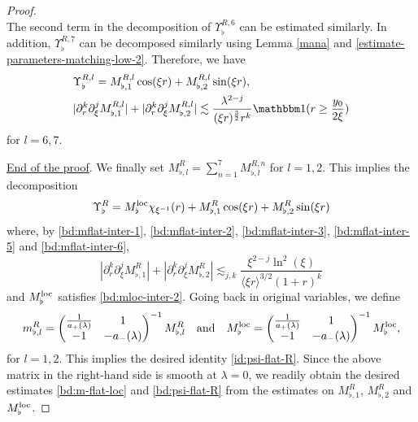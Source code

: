 \documentclass[11 pt]{amsart}
\theoremstyle{definition}
\theoremstyle{remark}
\numberwithin{equation}{section}
\begin{document}
\begin{proof}
$$$$
The second term in the decomposition of $\Upsilon^{R,6}_\flat$ can be estimated similarly. In addition, $\Upsilon_\flat^{R,7}$ can be decomposed similarly using Lemma \ref{mana} and \eqref{estimate-parameters-matching-low-2}. Therefore, we have
\begin{align}
\nonumber & \Upsilon^{R,l}_\flat=M^{R,l}_{\flat,1}\cos(\xi r)+M^{R,l}_{\flat,2}\sin(\xi r) ,\\
& \label{bd:mflat-inter-6} |\partial_r^k \partial_\xi^j M^{R,l}_{\flat,1}|+|\partial_r^k \partial_\xi^j M^{R,l}_{\flat,2}|\lesssim  \frac{\lambda^{2-j}}{(\xi r)^{\frac 32}r^k}\mathbbm 1(r\geq \frac{y_0}{2\xi})
\end{align}
for $l=6,7$.

\smallskip

\noindent \underline{End of the proof}. We finally set $M_{\flat,l}^R=\sum_{n=1}^7 M_{\flat,l}^{R,n}$ for $l=1,2$. This implies the decomposition
$$
\Upsilon^R_\flat =M^{\textup{loc}}_\flat \chi_{\xi^{-1}}(r)+M^{R}_{\flat,1}\cos(\xi r)+M^{R}_{\flat,2}\sin(\xi r)
$$
where, by \eqref{bd:mflat-inter-1}, \eqref{bd:mflat-inter-2}, \eqref{bd:mflat-inter-3}, \eqref{bd:mflat-inter-5} and \eqref{bd:mflat-inter-6},
$$
 |\partial_r^k \partial_\xi^j M^{R}_{\flat,1}|+|\partial_r^k \partial_\xi^j M^{R}_{\flat,2}|\lesssim_{j,k} \frac{\xi^{2 - j} \ln^2 (\xi)}{\langle \xi r \rangle^{3 / 2} (1 + r)^k} 
$$
and $M^{\textup{loc}}_\flat$ satisfies \eqref{bd:mloc-inter-2}. Going back in original variables, we define
$$
m^{R}_{\flat,l} = \begin{pmatrix}  \frac{1}{a_+ (\lambda)} & 1\\ - 1 & - a_- (\lambda)  \end{pmatrix}^{-1} M^{R}_{\flat,l} \quad \mbox{and} \quad M^{\textup{loc}}_{\flat} = \begin{pmatrix}  \frac{1}{a_+ (\lambda)} & 1\\ - 1 & - a_- (\lambda)  \end{pmatrix}^{-1} M^{\textup{loc}}_{\flat},
$$
for $l=1,2$. This implies the desired identity \eqref{id:psi-flat-R}. Since the above matrix in the right-hand side is smooth at $\lambda=0$, we readily obtain the desired estimates \eqref{bd:m-flat-loc} and \eqref{bd:psi-flat-R} from the estimates on $M^{R}_{\flat,1}$, $M^{R}_{\flat,2}$ and $M^{\textup{loc}}_{\flat}$.

\end{proof}





\appendix
\end{document}
